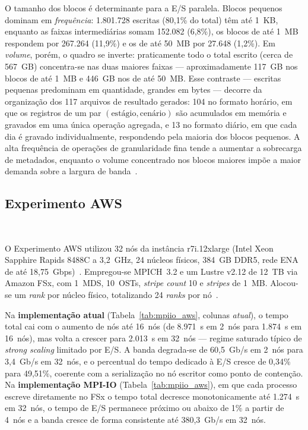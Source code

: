 \documentclass[12pt]{article}
\begin{document}
O tamanho dos blocos é determinante para a E/S paralela. Blocos pequenos dominam em \emph{frequência}: 1.801.728 escritas (80,1\% do total) têm até 1~KB, enquanto as faixas intermediárias somam 152.082 (6,8\%), os blocos de até 1~MB respondem por 267.264 (11,9\%) e os de até 50~MB por 27.648 (1,2\%). Em \emph{volume}, porém, o quadro se inverte: praticamente todo o total escrito (cerca de 567~GB) concentra-se nas duas maiores faixas --- aproximadamente 117~GB nos blocos de até 1~MB e 446~GB nos de até 50~MB. Esse contraste --- escritas pequenas predominam em quantidade, grandes em bytes --- decorre da organização dos 117 arquivos de resultado gerados: 104 no formato horário, em que os registros de um par $(\text{estágio}, \text{cenário})$ são acumulados em memória e gravados em uma única operação agregada, e 13 no formato diário, em que cada dia é gravado individualmente, respondendo pela maioria dos blocos pequenos. A alta frequência de operações de granularidade fina tende a aumentar a sobrecarga de metadados, enquanto o volume concentrado nos blocos maiores impõe a maior demanda sobre a largura de banda~\cite{Rwe:99,Phrrbrw:09}.

\subsection{Experimento AWS}~\label{sec:exp_aws}

O Experimento AWS utilizou 32 nós da instância r7i.12xlarge (Intel Xeon Sapphire Rapids 8488C a 3,2~GHz, 24 núcleos físicos, 384~GB DDR5, rede ENA de até 18,75~Gbps)~\cite{aws:ena}. Empregou-se MPICH~3.2 e um Lustre v2.12 de 12~TB via Amazon FSx, com 1~MDS, 10~OSTs, \textit{stripe count} 10 e \textit{stripes} de 1~MB. Alocou-se um \textit{rank} por núcleo físico, totalizando 24 \textit{ranks} por nó~\cite{intel:23,aws:24}.

Na \textbf{implementação atual} (Tabela~\ref{tab:mpiio_aws}, colunas \emph{atual}), o tempo total cai com o aumento de nós até 16~nós (de 8.971~s em 2~nós para 1.874~s em 16~nós), mas volta a crescer para 2.013~s em 32~nós --- regime saturado típico de \textit{strong scaling} limitado por E/S. A banda degrada-se de 60,5~Gb/s em 2~nós para 3,4~Gb/s em 32~nós, e o percentual do tempo dedicado à E/S cresce de 0,34\% para 49,51\%, coerente com a serialização no nó escritor como ponto de contenção. Na \textbf{implementação MPI-IO} (Tabela~\ref{tab:mpiio_aws}), em que cada processo escreve diretamente no FSx o tempo total decresce monotonicamente até 1.274~s em 32~nós, o tempo de E/S permanece próximo ou abaixo de 1\% a partir de 4~nós e a banda cresce de forma consistente até 380,3~Gb/s em 32~nós.
\end{document}
